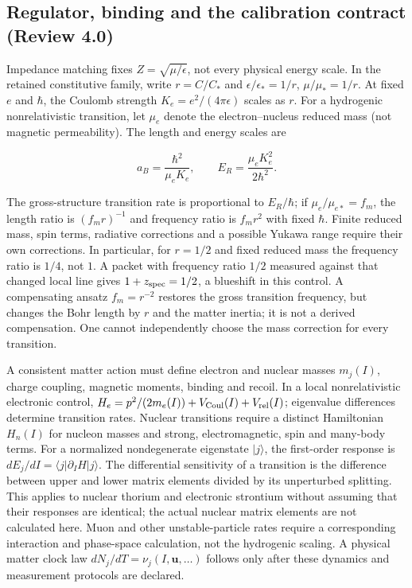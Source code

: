 \documentclass[
  11pt,
  twoside]{article}
\begin{document}
\subsection{Regulator, binding and the calibration contract (Review
4.0)}\label{regulator-binding-and-the-calibration-contract-review-4.0}

Impedance matching fixes \(Z=\sqrt{\mu/\epsilon}\), not every physical
energy scale. In the retained constitutive family, write \(r=C/C_*\) and
\(\epsilon/\epsilon_*=1/r\), \(\mu/\mu_*=1/r\). At fixed \(e\) and
\(\hbar\), the Coulomb strength \(K_e=e^2/(4\pi\epsilon)\) scales as
\(r\). For a hydrogenic nonrelativistic transition, let \(\mu_e\) denote
the electron--nucleus reduced mass (not magnetic permeability). The
length and energy scales are

\[a_B=\frac{\hbar^2}{\mu_e K_e},\qquad E_R=\frac{\mu_e K_e^2}{2\hbar^2}.\tag{C1}\]

The gross-structure transition rate is proportional to \(E_R/\hbar\); if
\(\mu_e/\mu_{e*}=f_m\), the length ratio is \((f_m r)^{-1}\) and
frequency ratio is \(f_m r^2\) with fixed \(\hbar\). Finite reduced
mass, spin terms, radiative corrections and a possible Yukawa range
require their own corrections. In particular, for \(r=1/2\) and fixed
reduced mass the frequency ratio is \(1/4\), not \(1\). A packet with
frequency ratio \(1/2\) measured against that changed local line gives
\(1+z_{\rm spec}=1/2\), a blueshift in this control. A compensating
ansatz \(f_m=r^{-2}\) restores the gross transition frequency, but
changes the Bohr length by \(r\) and the matter inertia; it is not a
derived compensation. One cannot independently choose the mass
correction for every transition.

A consistent matter action must define electron and nuclear masses
\(m_j(I)\), charge coupling, magnetic moments, binding and recoil. In a
local nonrelativistic electronic control,
\(H_e=p^2/(2m_e(I))+V_{\rm Coul}(I)+V_{\rm rel}(I)\); eigenvalue
differences determine transition rates. Nuclear transitions require a
distinct Hamiltonian \(H_n(I)\) for nucleon masses and strong,
electromagnetic, spin and many-body terms. For a normalized
nondegenerate eigenstate \(|j\rangle\), the first-order response is
\(dE_j/dI=\langle j|\partial_I H|j\rangle\). The differential
sensitivity of a transition is the difference between upper and lower
matrix elements divided by its unperturbed splitting. This applies to
nuclear thorium and electronic strontium without assuming that their
responses are identical; the actual nuclear matrix elements are not
calculated here. Muon and other unstable-particle rates require a
corresponding interaction and phase-space calculation, not the
hydrogenic scaling. A physical matter clock law
\(dN_j/dT=\nu_j(I,\mathbf{u},\ldots)\) follows only after these dynamics
and measurement protocols are declared.
\end{document}
